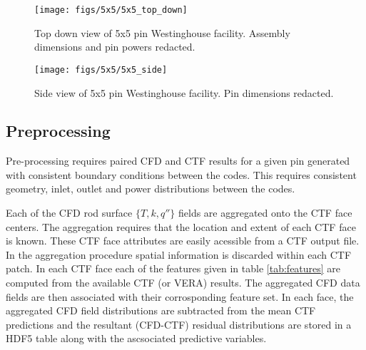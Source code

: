 \begin{figure}[H]
    \centering
    \texttt{[image: figs/5x5/5x5\_top\_down]}
    \caption[Top down view of 5x5 pin Westinghouse facility.]{Top down view of 5x5 pin Westinghouse facility.  Assembly dimensions and pin powers redacted.}
    \label{fig:5x5topdown}
\end{figure}

\begin{figure}[H]
    \centering
    \texttt{[image: figs/5x5/5x5\_side]}
    \caption[Side view of 5x5 pin Westinghouse facility.]{Side view of 5x5 pin Westinghouse facility.  Pin dimensions redacted.}
    \label{fig:5x5side}
\end{figure}


\subsection{Preprocessing}
\label{sec:preprocessing}

Pre-processing requires paired CFD and CTF results for a given pin generated with consistent boundary conditions between the codes.  This requires consistent geometry, inlet, outlet and power distributions between the codes.

Each of the CFD rod surface $\{T,k,q''\}$ fields are aggregated onto the CTF face centers.  The aggregation requires that the location and extent of each CTF face is known.  These CTF face attributes are easily acessible from a CTF output file.  In the aggregation procedure spatial information is discarded within each CTF patch.
In each CTF face each of the features given in table \ref{tab:features} are computed from the available CTF (or VERA) results.
The aggregated CFD data fields are then associated with their corrosponding feature set.
In each face, the aggregated CFD field distributions are subtracted from the mean CTF predictions and the resultant (CFD-CTF) residual distributions are stored in a HDF5 table along with the ascsociated predictive variables.

